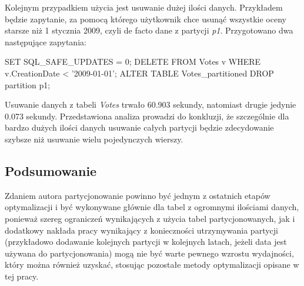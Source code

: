 Kolejnym przypadkiem użycia jest usuwanie dużej ilości danych. Przykładem będzie zapytanie, za pomocą którego użytkownik chce usunąć wszystkie oceny starsze niż 1 stycznia 2009, czyli de facto dane z partycji \textit{p1}. Przygotowano dwa następujące zapytania:
\begin{spverbatim}
	SET SQL_SAFE_UPDATES = 0;
	DELETE FROM Votes v WHERE v.CreationDate < '2009-01-01';
	ALTER TABLE Votes_partitioned DROP partition p1;
\end{spverbatim}
Usuwanie danych z tabeli \textit{Votes} trwało 60.903 sekundy, natomiast drugie jedynie 0.073 sekundy. Przedstawiona analiza prowadzi do konkluzji, że szczególnie dla bardzo dużych ilości danych usuwanie całych partycji będzie zdecydowanie szybsze niż usuwanie wielu pojedynczych wierszy.

\subsection{Podsumowanie}

Zdaniem autora partycjonowanie powinno być jednym z ostatnich etapów optymalizacji i być wykonywane głównie dla tabel z ogromnymi ilościami danych, ponieważ szereg ograniczeń wynikających z użycia tabel partycjonowanych, jak i dodatkowy nakłada pracy wynikający z konieczności utrzymywania partycji (przykładowo dodawanie kolejnych partycji w kolejnych latach, jeżeli data jest używana do partycjonowania) mogą nie być warte pewnego wzrostu wydajności, który można również uzyskać, stosując pozostałe metody optymalizacji opisane w tej pracy.

